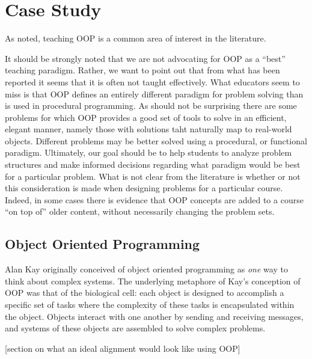 \documentclass[12pt]{article}
\begin{document}
\section{Case Study}
As noted, teaching OOP is a common area of interest in the literature. 

It should be strongly noted that we are not advocating for OOP as a
``best'' teaching paradigm. Rather, we want to point out that from
what has been reported it seems that it is often not taught
effectively. What educators seem to miss is that OOP defines an
entirely different paradigm for problem solving than is used in
procedural programming\autocite{kolling_problem_1999}. As should not
be surprising there are some problems for which OOP provides a good
set of tools to solve in an efficient, elegant manner, namely those
with solutions taht naturally map to real-world
objects\autocite{raymond_art_2003}. Different problems may be better
solved using a procedural, or functional
paradigm\autocite{kay_history_1996,felleisen_functional_2009,crestani_experience_2010}. Ultimately,
our goal should be to help students to analyze problem structures and
make informed decisions regarding what paradigm would be best for a
particular problem. What is not clear from the literature is whether
or not this consideration is made when designing problems for a
particular course. Indeed, in some cases there is evidence that OOP
concepts are added to a course ``on top of'' older content, without
necessarily changing the problem
sets\autocite{kolling_problem_1999,vilner_fundamental_2007}.

\subsection{Object Oriented Programming}

Alan Kay originally conceived of object oriented programming as
\emph{one} way to think about complex
systems\autocite{kay_history_1996}. The underlying metaphore of Kay's
conception of OOP was that of the biological cell: each object is
designed to accomplish a specific set of tasks where the complexity of
these tasks is encapsulated within the object. Objects interact with
one another by sending and receiving messages, and systems of these
objects are assembled to solve complex
problems\autocite{kay_history_1996}.


[section on what an ideal alignment would look like using OOP] 
\end{document}
